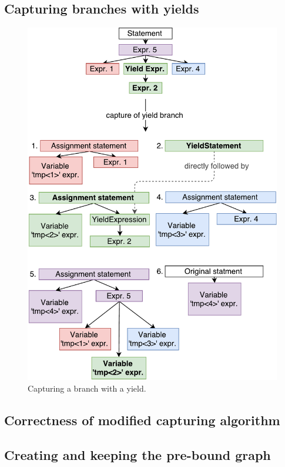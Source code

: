 \subsection{Capturing branches with yields}

\begin{figure}[h]
	\centering	
	\includegraphics[scale=0.75]{../img/5_3_branchesWithYields}	
	\caption{Capturing a branch with a yield.}
	\label{fig5.3:CaptureWithYield}
\end{figure}

\subsection{Correctness of modified capturing algorithm}

\subsection{Creating and keeping the pre-bound graph}

